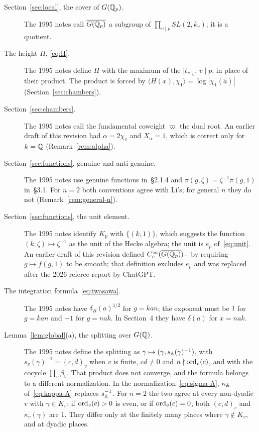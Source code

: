 \begin{description}
\item[Section~\ref{sec:local}, the cover of $G(\mathbb{Q}_p)$.] The 1995 notes call $\overline{G(\mathbb{Q}_p)}$ a subgroup of $\prod_{v\mid p}\overline{SL(2,k_v)}$; it is a quotient.

\item[The height $H$, \eqref{eq:H}.] The 1995 notes define $H$ with the maximum of the $|t_v|_v$, $v\mid p$, in place of their product. The product is forced by $\langle H(x),\chi_1\rangle=\log|\chi_1(\tilde a)|$ (Section~\ref{sec:chambers}).

\item[Section~\ref{sec:chambers}.] The 1995 notes call the fundamental coweight $\varpi$ the dual root. An earlier draft of this revision had $\alpha=2\chi_1$ and $X_\alpha=1$, which is correct only for $k=\mathbb{Q}$ (Remark~\ref{rem:alpha}).

\item[Section~\ref{sec:functions}, genuine and anti-genuine.] The 1995 notes use genuine functions in~\S2.1.4 and $\pi(g,\zeta)=\zeta^{-1}\pi(g,1)$ in~\S3.1. For $n=2$ both conventions agree with Li's; for general $n$ they do not (Remark~\ref{rem:general-n}).

\item[Section~\ref{sec:functions}, the unit element.] The 1995 notes identify $K_p$ with $\{(k,1)\}$, which suggests the function $(k,\zeta)\mapsto\zeta^{-1}$ as the unit of the Hecke algebra; the unit is $e_p$ of~\eqref{eq:unit}. An earlier draft of this revision defined $C_c^\infty(\overline{G(\mathbb{Q}_p)})_-$ by requiring $g\mapsto f(g,1)$ to be smooth; that definition excludes $e_p$ and was replaced after the 2026 referee report by ChatGPT.

\item[The integration formula~\eqref{eq:iwasawa}.] The 1995 notes have $\delta_B(a)^{1/2}$ for $g=kan$; the exponent must be $1$ for $g=kan$ and $-1$ for $g=nak$. In Section~4 they have $\delta(a)$ for $x=nak$.

\item[Lemma~\ref{lem:global}(a), the splitting over $G(\mathbb{Q})$.] The 1995 notes define the splitting as $\gamma\mapsto(\gamma,
s_{\mathbb{A}}(\gamma)^{-1})$, with $s_v(\gamma)^{-1}=(c,d)_v$ when $v$ is finite,
$cd\ne0$ and $n\nmid\operatorname{ord}_v(c)$, and with the cocycle $\prod_v\beta_v$.
That product does not converge, and the formula belongs to a different
normalization. In the normalization~\eqref{eq:sigma-A},
$\kappa_{\mathbb{A}}$ of~\eqref{eq:kappa-A} replaces $s_{\mathbb{A}}^{-1}$. For $n=2$ the two
agree at every non-dyadic $v$ with $\gamma\in K_v$: if $\operatorname{ord}_v(c)>0$ is
even, or if $\operatorname{ord}_v(c)=0$, both $(c,d)_v$ and $\kappa_v(\gamma)$ are $1$.
They differ only at the finitely many places where $\gamma\notin K_v$,
and at dyadic places.

\end{description}

